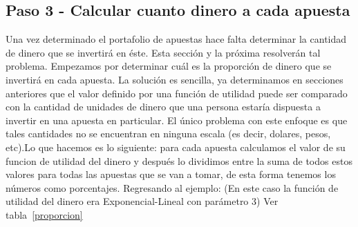 \begin{table}[ht]
\centering
{}
\caption{Escogiendo apuestas que vale la pena realizar}
\label{seleccion}
\end{table}

\subsection{Paso 3 - Calcular cuanto dinero a cada apuesta}
\label{sec:paso-3}

Una vez determinado el portafolio de apuestas hace falta determinar la cantidad de dinero que se invertirá en éste. Esta sección y la próxima resolverán tal problema.
 Empezamos por determinar cuál es la proporción de dinero que se invertirá en cada apuesta. La solución es sencilla, ya determinamos en secciones anteriores que el valor definido por una función de utilidad puede ser comparado con la cantidad de unidades de dinero que una persona estaría dispuesta a invertir en una apuesta en particular. El único problema con este enfoque es que tales cantidades no se encuentran en ninguna escala (es decir, dolares, pesos, etc).Lo que hacemos es lo siguiente: para cada apuesta calculamos el valor de su funcion de utilidad del dinero y después lo dividimos entre la suma de todos estos valores para todas las apuestas que se van a tomar, de esta forma tenemos los números como porcentajes.
 Regresando al ejemplo: (En este caso la función de utilidad del dinero era Exponencial-Lineal con parámetro 3)
Ver tabla~\ref{proporcion}


